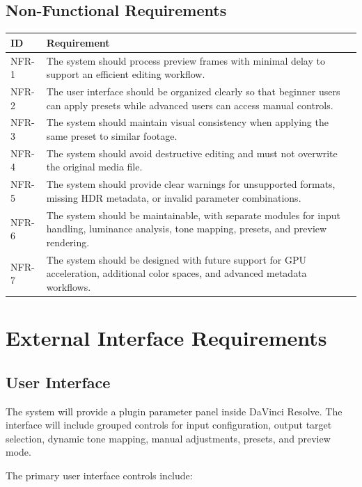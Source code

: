\documentclass[12pt]{article}
\begin{document}
\subsection{Non-Functional Requirements}

\begin{longtable}{|p{2.2cm}|p{12.5cm}|}
\hline
\textbf{ID} & \textbf{Requirement} \\
\hline
NFR-1 & The system should process preview frames with minimal delay to support an efficient editing workflow. \\
\hline
NFR-2 & The user interface should be organized clearly so that beginner users can apply presets while advanced users can access manual controls. \\
\hline
NFR-3 & The system should maintain visual consistency when applying the same preset to similar footage. \\
\hline
NFR-4 & The system should avoid destructive editing and must not overwrite the original media file. \\
\hline
NFR-5 & The system should provide clear warnings for unsupported formats, missing HDR metadata, or invalid parameter combinations. \\
\hline
NFR-6 & The system should be maintainable, with separate modules for input handling, luminance analysis, tone mapping, presets, and preview rendering. \\
\hline
NFR-7 & The system should be designed with future support for GPU acceleration, additional color spaces, and advanced metadata workflows. \\
\hline
\end{longtable}


\section{External Interface Requirements}

\subsection{User Interface}
The system will provide a plugin parameter panel inside DaVinci Resolve. The interface will include grouped controls for input configuration, output target selection, dynamic tone mapping, manual adjustments, presets, and preview mode.

The primary user interface controls include:
\end{document}
